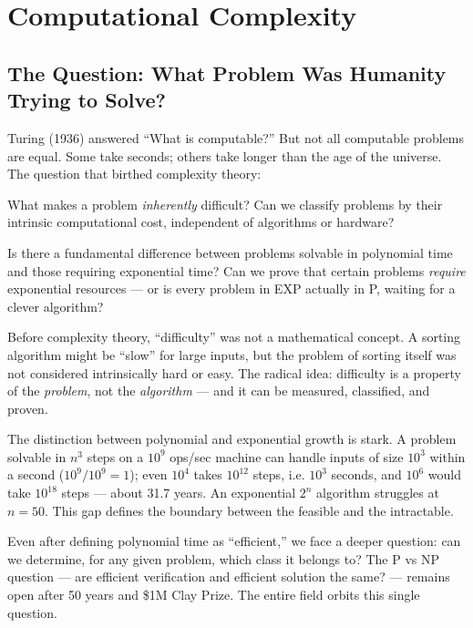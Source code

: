 
\chapter{Computational Complexity}
\label{ch:complexity}

\section{The Question: What Problem Was Humanity Trying to Solve?}
\label{sec:complexity:question}

Turing (1936) answered ``What is computable?'' But not all computable problems are equal. Some take seconds; others take longer than the age of the universe. The question that birthed complexity theory:

What makes a problem \emph{inherently} difficult? Can we classify problems by their intrinsic computational cost, independent of algorithms or hardware?

Is there a fundamental difference between problems solvable in polynomial time and those requiring exponential time? Can we prove that certain problems \emph{require} exponential resources — or is every problem in EXP actually in P, waiting for a clever algorithm?

Before complexity theory, ``difficulty'' was not a mathematical concept. A sorting algorithm might be ``slow'' for large inputs, but the problem of sorting itself was not considered intrinsically hard or easy. The radical idea: difficulty is a property of the \emph{problem}, not the \emph{algorithm} — and it can be measured, classified, and proven.

The distinction between polynomial and exponential growth is stark. A problem solvable in $n^3$ steps on a $10^9$ ops/sec machine can handle inputs of size $10^3$ within a second ($10^9/10^9 = 1$); even $10^4$ takes $10^{12}$ steps, i.e. $10^3$ seconds, and $10^6$ would take $10^{18}$ steps --- about 31.7 years. An exponential $2^n$ algorithm struggles at $n = 50$. This gap defines the boundary between the feasible and the intractable.

Even after defining polynomial time as ``efficient,'' we face a deeper question: can we determine, for any given problem, which class it belongs to? The P vs NP question — are efficient verification and efficient solution the same? — remains open after 50 years and \$1M Clay Prize. The entire field orbits this single question.

